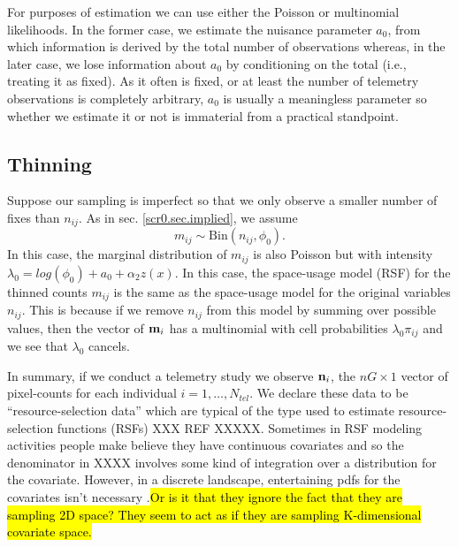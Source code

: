 For purposes of estimation we can use either the Poisson or
multinomial likelihoods. In the former case, we estimate the nuisance
parameter $a_{0}$, from which information is derived by the total
number of observations whereas, in the later case, we lose information
about $a_{0}$ by conditioning on the total (i.e., treating it as
fixed).  As it often is fixed, or at least the number of telemetry
observations is completely arbitrary, $a_{0}$ is usually a meaningless
parameter so whether we estimate it or not is immaterial from a
practical standpoint.


\subsection{Thinning}

Suppose our sampling is imperfect so that we only observe a smaller
number of fixes than $n_{ij}$. As in sec. \ref{scr0.sec.implied}, we assume
\[
 m_{ij} \sim \mbox{Bin}(n_{ij}, \phi_{0}).
\]
In this case, the marginal distribution of $m_{ij}$ is also Poisson
but with intensity $\lambda_{0} = log(\phi_{0}) + a_{0} +
\alpha_{2}z(x)$.  In this case, the space-usage model (RSF) for the
thinned counts $m_{ij}$ is the same as the space-usage model for the
original variables $n_{ij}$.  This is because if we remove $n_{ij}$
from this model by summing over possible values, then the vector of
${\bf m}_{i}$ has a multinomial with cell probabilities
$\lambda_{0}\pi_{ij}$ and we see that $\lambda_{0}$ cancels.


In summary, if we conduct a telemetry study we observe ${\bf n}_{i}$,
the $nG \times 1$ vector of pixel-counts for each individual
$i=1,\ldots,N_{tel}$.  We declare these data to be
``resource-selection data'' which are typical of the type used to
estimate resource-selection functions (RSFs) XXX REF XXXXX. Sometimes
in RSF modeling activities people make believe they have continuous
covariates and so the denominator in XXXX involves some kind of
integration over a distribution for the covariate. However, in a
discrete landscape, entertaining pdfs for the covariates isn't
necessary \citep{royle_etal:2012mee}.\hl{Or is it that they ignore the
  fact that they are sampling 2D space? They seem to act as if they
  are sampling K-dimensional covariate space.}


